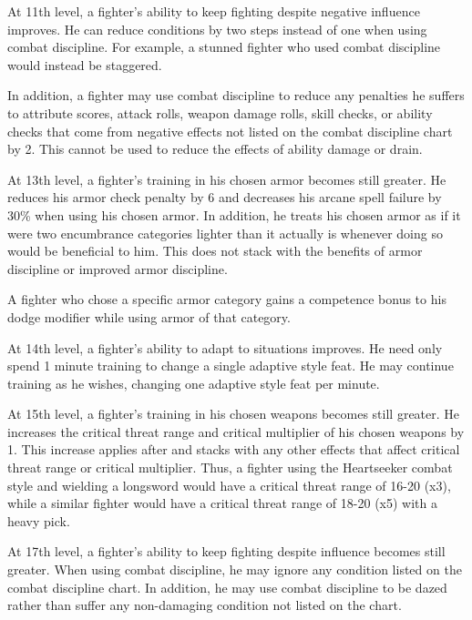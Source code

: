  At 11th level, a fighter's ability to keep fighting despite negative influence improves. He can reduce conditions by two steps instead of one when using combat discipline. For example, a stunned fighter who used combat discipline would instead be staggered.
\par In addition, a fighter may use combat discipline to reduce any penalties he suffers to attribute scores, attack rolls, weapon damage rolls, skill checks, or ability checks that come from negative effects not listed on the combat discipline chart by 2. This cannot be used to reduce the effects of ability damage or drain.

 At 13th level, a fighter's training in his chosen armor becomes still greater. He reduces his armor check penalty by 6 and decreases his arcane spell failure by 30\% when using his chosen armor. In addition, he treats his chosen armor as if it were two encumbrance categories lighter than it actually is whenever doing so would be beneficial to him. This does not stack with the benefits of armor discipline or improved armor discipline.
\par A fighter who chose a specific armor category gains a  competence bonus to his dodge modifier while using armor of that category.

 At 14th level, a fighter's ability to adapt to situations improves. He need only spend 1 minute training to change a single adaptive style feat. He may continue training as he wishes, changing one adaptive style feat per minute.

 At 15th level, a fighter's training in his chosen weapons becomes still greater. He increases the critical threat range and critical multiplier of his chosen weapons by 1. This increase applies after and stacks with any other effects that affect critical threat range or critical multiplier. Thus, a fighter using the Heartseeker combat style and wielding a longsword would have a critical threat range of 16-20 (x3), while a similar fighter would have a critical threat range of 18-20 (x5) with a heavy pick.

 At 17th level, a fighter's ability to keep fighting despite influence becomes still greater. When using combat discipline, he may ignore any condition listed on the combat discipline chart. In addition, he may use combat discipline to be dazed rather than suffer any non-damaging condition not listed on the chart.

